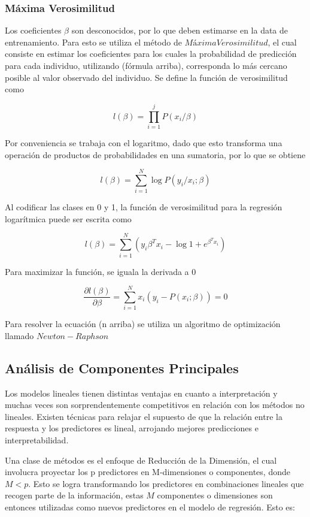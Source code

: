 \documentclass[a4paper,12pt]{Latex/Classes/PhDthesisPSnPDF}
\begin{document}
\subsubsection{Máxima Verosimilitud}

Los coeficientes $\beta$ son desconocidos, por lo que deben estimarse en la data de entrenamiento. Para esto se utiliza el método de $Máxima Verosimilitud$, el cual consiste en estimar los coeficientes para los cuales la probabilidad de predicción para cada individuo, utilizando (fórmula arriba), corresponda lo más cercano posible al valor observado del individuo. Se define la función de verosimilitud como

$$ l(\beta) = \prod_{i=1}^{j}{P(x_{i} / \beta)} $$
  
Por conveniencia se  trabaja con el logaritmo, dado que esto transforma una operación de productos de probabilidades en una sumatoria, por lo que se obtiene

$$ l(\beta) = \sum_{i=1}^{N} \log{P(y_{i}/ x_{i}; \beta)} $$

Al codificar las clases en 0 y 1, la función de verosimilitud para la regresión logarítmica puede ser escrita como

$$ l(\beta) = \sum_{i=1}^{N}(y_{i}\beta^{T}x_{i} - \log{1 + e^{\beta^{T}x_{i}}}) $$

Para maximizar la función, se iguala la derivada a 0

$$ \frac{\partial l(\beta)}{\partial \beta} = \sum_{i=1}^{N}x_{i}(y_{i} - P(x_{i}; \beta)) = 0 $$

Para resolver la ecuación (n arriba) se utiliza un algoritmo de optimización llamado $Newton-Raphson$

\subsection{Análisis de Componentes Principales}

Los modelos lineales tienen distintas ventajas en cuanto a interpretación y muchas veces son sorprendentemente competitivos en relación con los métodos no lineales. Existen técnicas para relajar el supuesto de  que la relación entre la respuesta y los predictores es lineal, arrojando mejores predicciones e interpretabilidad. 

Una clase de métodos es el enfoque de Reducción de la Dimensión, el cual involucra proyectar los p predictores en M-dimensiones o componentes, donde $M < p$. Esto se logra transformando los predictores en combinaciones lineales que recogen parte de la información, estas $M$ componentes o dimensiones son entonces utilizadas como nuevos predictores en el modelo de regresión. Esto es:
\end{document}
